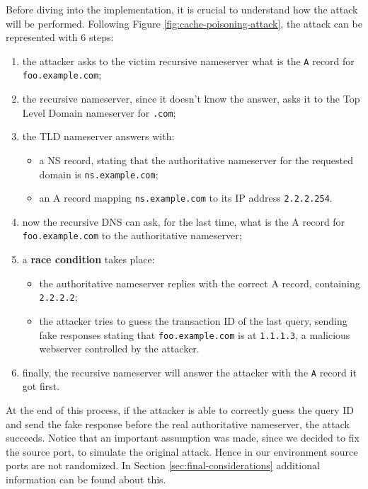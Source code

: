 \documentclass[11pt,a4paper]{article}
\begin{document}
\noindent
Before diving into the implementation, it is crucial to understand how the attack will be performed. Following Figure \ref{fig:cache-poisoning-attack}, the attack can be represented with 6 steps:
\begin{enumerate}
    \item the attacker asks to the victim recursive nameserver what is the \texttt{A} record for\\\texttt{foo.example.com};
    \item the recursive nameserver, since it doesn't know the answer, asks it to the Top Level Domain nameserver for \texttt{.com};
    \item the TLD nameserver answers with: 
    \begin{itemize}
        \item a NS record, stating that the authoritative nameserver for the requested domain is \texttt{ns.example.com};
        \item an A record mapping \texttt{ns.example.com} to its IP address \texttt{2.2.2.254}.
    \end{itemize}
    \item now the recursive DNS can ask, for the last time, what is the A record for \texttt{foo.example.com} to the authoritative nameserver;
    \item a \textbf{race condition} takes place:
    \begin{itemize}
        \item the authoritative nameserver replies with the correct A record, containing \texttt{2.2.2.2};
        \item the attacker tries to guess the transaction ID of the last query, sending fake responses stating that \texttt{foo.example.com} is at \texttt{1.1.1.3}, a malicious webserver controlled by the attacker.
    \end{itemize}
    \item finally, the recursive nameserver will answer the attacker with the \texttt{A} record it got first.
\end{enumerate}

\noindent
At the end of this process, if the attacker is able to correctly guess the query ID and send the fake response before the real authoritative nameserver, the attack succeeds. Notice that an important assumption was made, since we decided to fix the source port, to simulate the original attack. Hence in our environment source ports are not randomized. In Section \ref{sec:final-considerations} additional information can be found about this.
\end{document}
